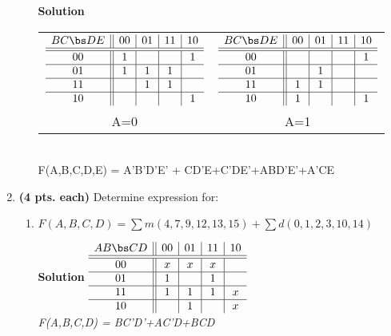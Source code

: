 \begin{enumerate}
\begin{enumerate}
\begin{onlysolution}  \textbf{Solution} \itshape{
\begin{tabular}{cc}
$\begin{array} {c||c|c|c|c}
   B C \bs D E   & 00 & 01 & 11 & 10 \\ \hline \hline
       00        & 1  &    &    & 1  \\ \hline
       01        & 1  & 1  & 1  &    \\ \hline
       11        &    & 1  & 1  &    \\ \hline
       10        &    &    &    & 1  \\
\end{array}$ &
$\begin{array} {c||c|c|c|c}
   B C \bs D E   & 00 & 01 & 11 & 10 \\ \hline \hline
       00        &    &    &    & 1  \\ \hline
       01        &    & 1  &    &    \\ \hline
       11        & 1  & 1  &    &    \\ \hline
       10        & 1  &    &    & 1  \\
\end{array}$ \\
A=0 & A=1 \\
\end{tabular} \\
F(A,B,C,D,E) = A'B'D'E' + CD'E+C'DE'+ABD'E'+A'CE
} \end{onlysolution} 

\end{enumerate}

\item \textbf{ (4 pts. each)} Determine \SOPmin expression for:
\begin{enumerate}
\item $F(A,B,C,D)=\sum m(4,7,9,12,13,15)+\sum d(0,1,2,3,10,14)$

\begin{onlysolution}  \textbf{Solution} \itshape{
$\begin{array} {c||c|c|c|c}
   A B \bs C D   & 00 & 01 & 11 & 10 \\ \hline \hline
       00        & x  & x  & x  &    \\ \hline
       01        & 1  &    & 1  &    \\ \hline
       11        & 1  & 1  & 1  & x  \\ \hline
       10        &    & 1  &    & x  \\
\end{array}$  \\
F(A,B,C,D) = BC'D'+AC'D+BCD
} \end{onlysolution} 


\end{enumerate}
\end{enumerate}
